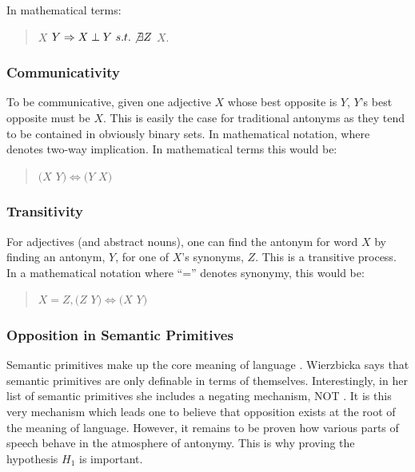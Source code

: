 In mathematical terms: 
	\begin{quote}
		$X$ \opp $Y \Rightarrow X \perp Y~s.t. \not\exists Z$ \opp $X$.
	\end{quote}

\subsubsection {Communicativity} 
To be communicative, given one adjective $X$ whose best opposite is $Y$, $Y$’s best opposite must be $X$.  This is easily the case for traditional antonyms as they tend to be contained in obviously binary sets. In mathematical notation, where  denotes two-way implication.  In mathematical terms this would be: 
	\begin{quote}
		$(X$ \opp $Y) \Leftrightarrow (Y$ \opp $X)$
	\end{quote}

\subsubsection {Transitivity} 
For adjectives (and abstract nouns), one can find the antonym for word $X$ by finding an antonym, $Y$, for one of $X$’s synonyms, $Z$.  This is a transitive process.  In a mathematical notation where ``='' denotes synonymy, this would be: 
	\begin{quote}
		$X = Z, (Z$ \opp $Y) \Leftrightarrow (X$ \opp $Y)$
	\end{quote}

%

\subsubsection {Opposition in Semantic Primitives} 
Semantic primitives make up the core meaning of language \cite{Wierzbicka}.  Wierzbicka says that semantic primitives are only definable in terms of themselves.  Interestingly, in her list of semantic primitives she includes a negating mechanism, NOT \cite{Wierzbicka}.  It is this very mechanism which leads one to believe that opposition exists at the root of the meaning of language.  However, it remains to be proven how various parts of speech behave in the atmosphere of antonymy.  This is why proving the hypothesis $H_{1}$ is important.

